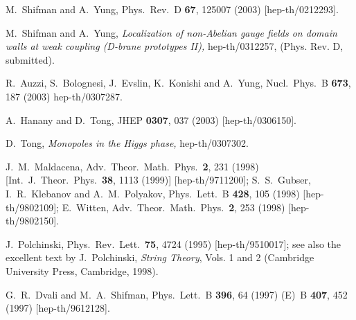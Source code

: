 \documentclass[12pt,epsf]{article}
\begin{document}

\begin{thebibliography}{99}

M.~Shifman and A.~Yung,
Phys.\ Rev.\ D {\bf 67}, 125007 (2003)
[hep-th/0212293].

M.~Shifman and A.~Yung,
{\em Localization of non-Abelian gauge fields on domain walls at weak coupling
(D-brane prototypes II),}
hep-th/0312257, (Phys. Rev. D, submitted).

R.~Auzzi, S.~Bolognesi, J.~Evslin, K.~Konishi and A.~Yung,
Nucl.\ Phys.\ B {\bf 673}, 187 (2003)
hep-th/0307287.  %

A.~Hanany and D.~Tong,
JHEP {\bf 0307}, 037 (2003)
[hep-th/0306150].

D.~Tong,
{\em Monopoles in the Higgs phase,}
hep-th/0307302.

J.~M.~Maldacena,
Adv.\ Theor.\ Math.\ Phys.\  {\bf 2}, 231 (1998)
[Int.\ J.\ Theor.\ Phys.\  {\bf 38}, 1113 (1999)]
[hep-th/9711200];
S.~S.~Gubser, I.~R.~Klebanov and A.~M.~Polyakov,
Phys.\ Lett.\ B {\bf 428}, 105 (1998)
[hep-th/9802109];
E.~Witten,
Adv.\ Theor.\ Math.\ Phys.\  {\bf 2}, 253 (1998)
[hep-th/9802150].

J.~Polchinski,
Phys.\ Rev.\ Lett.\  {\bf 75}, 4724 (1995)
[hep-th/9510017];
see also the excellent text by J.~Polchinski, {\em String Theory}, Vols. 1 and 2
(Cambridge University Press,  Cambridge, 1998).

G.~R.~Dvali and M.~A.~Shifman,
Phys.\ Lett.\ B {\bf 396}, 64 (1997)
(E)\ B {\bf 407}, 452 (1997)
[hep-th/9612128].


\end{thebibliography}
\end{document}
